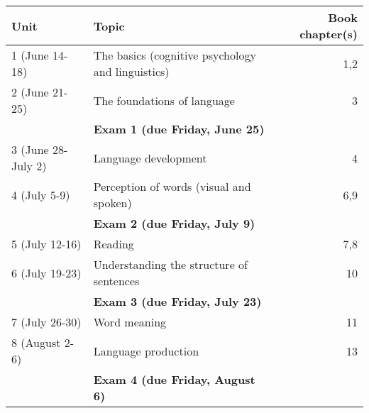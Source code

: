 \documentclass[10pt]{article}
\begin{document}
\begin{center}
\begin{tabular}{llr}
Unit & Topic & Book chapter(s)\\
\hline
1 (June 14-18) & The basics (cognitive psychology and linguistics) & 1,2\\
2 (June 21-25) & The foundations of language & 3\\
 & \textbf{Exam 1 (due Friday, June 25)} & \\
3 (June 28-July 2) & Language development & 4\\
4 (July 5-9) & Perception of words (visual and spoken) & 6,9\\
 & \textbf{Exam 2 (due Friday, July 9)} & \\
5 (July 12-16) & Reading & 7,8\\
6 (July 19-23) & Understanding the structure of sentences & 10\\
 & \textbf{Exam 3 (due Friday, July 23)} & \\
7 (July 26-30) & Word meaning & 11\\
8 (August 2-6) & Language production & 13\\
 & \textbf{Exam 4 (due Friday, August 6)} & \\
\end{tabular}
\end{center}
\end{document}
